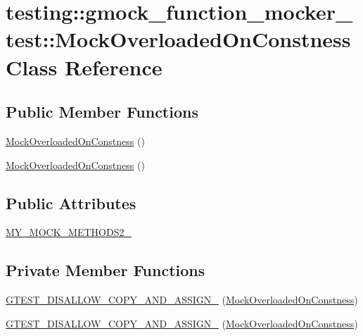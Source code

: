 \hypertarget{classtesting_1_1gmock__function__mocker__test_1_1_mock_overloaded_on_constness}{}\section{testing\+::gmock\+\_\+function\+\_\+mocker\+\_\+test\+::Mock\+Overloaded\+On\+Constness Class Reference}
\label{classtesting_1_1gmock__function__mocker__test_1_1_mock_overloaded_on_constness}
\subsection*{Public Member Functions}
\begin{DoxyCompactItemize}
\item 
\mbox{\hyperlink{classtesting_1_1gmock__function__mocker__test_1_1_mock_overloaded_on_constness_ad335f3cd11d69d8c292b79da41fc7a48}{Mock\+Overloaded\+On\+Constness}} ()
\item 
\mbox{\hyperlink{classtesting_1_1gmock__function__mocker__test_1_1_mock_overloaded_on_constness_ad335f3cd11d69d8c292b79da41fc7a48}{Mock\+Overloaded\+On\+Constness}} ()
\end{DoxyCompactItemize}
\subsection*{Public Attributes}
\begin{DoxyCompactItemize}
\item 
\mbox{\hyperlink{classtesting_1_1gmock__function__mocker__test_1_1_mock_overloaded_on_constness_afb4cd7a26e153426550b9501c7b6c16e}{M\+Y\+\_\+\+M\+O\+C\+K\+\_\+\+M\+E\+T\+H\+O\+D\+S2\+\_\+}}
\end{DoxyCompactItemize}
\subsection*{Private Member Functions}
\begin{DoxyCompactItemize}
\item 
\mbox{\hyperlink{classtesting_1_1gmock__function__mocker__test_1_1_mock_overloaded_on_constness_a1ca8994999ebbf4d2836bbedec51d222}{G\+T\+E\+S\+T\+\_\+\+D\+I\+S\+A\+L\+L\+O\+W\+\_\+\+C\+O\+P\+Y\+\_\+\+A\+N\+D\+\_\+\+A\+S\+S\+I\+G\+N\+\_\+}} (\mbox{\hyperlink{classtesting_1_1gmock__function__mocker__test_1_1_mock_overloaded_on_constness}{Mock\+Overloaded\+On\+Constness}})
\item 
\mbox{\hyperlink{classtesting_1_1gmock__function__mocker__test_1_1_mock_overloaded_on_constness_a1ca8994999ebbf4d2836bbedec51d222}{G\+T\+E\+S\+T\+\_\+\+D\+I\+S\+A\+L\+L\+O\+W\+\_\+\+C\+O\+P\+Y\+\_\+\+A\+N\+D\+\_\+\+A\+S\+S\+I\+G\+N\+\_\+}} (\mbox{\hyperlink{classtesting_1_1gmock__function__mocker__test_1_1_mock_overloaded_on_constness}{Mock\+Overloaded\+On\+Constness}})
\end{DoxyCompactItemize}


